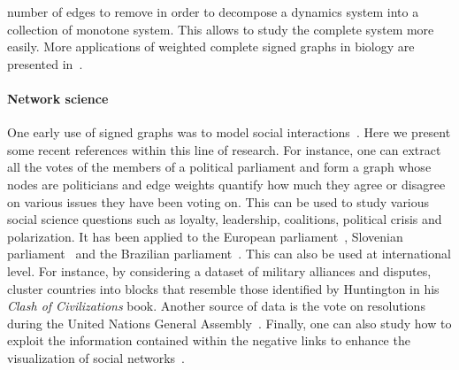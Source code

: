       number of edges to remove in order to decompose a dynamics system into a collection of
      monotone system. This allows to study
      the complete system more easily. More applications of weighted complete signed graphs in biology
      are presented in~\autocite[Section 6]{clusterEditSurvey13}.

      \paragraph{Network science}
      One early use of signed graphs was to model social
      interactions~\autocites{harary1953}{HeiderBook58}. Here we present
      some recent references within this line of research. For instance, one can extract all the
      votes of the members of a
      political parliament and form a graph whose nodes are politicians and edge weights quantify how
      much they agree or disagree on various issues they have been voting on. This can be used to
      study various social science questions such as loyalty, leadership, coalitions, political
      crisis and polarization. It has been applied to the European
      parliament~\autocite{Mendonca2015}, Slovenian parliament~\autocite{Jiang2015} and the
      Brazilian parliament~\autocites{BrazilCC17}. This can also be used at international level. For
      instance, by considering a dataset of military alliances and disputes, \textcite{Traag2009}
      cluster countries into blocks that resemble those identified by Huntington in his \emph{Clash
      of Civilizations} book. Another source of data is the vote on resolutions during the United
      Nations General Assembly~\autocite{CommunityUN12}. Finally, one can also study how to exploit
      the information contained within the negative links to enhance the visualization of social
      networks~\autocites{Luca10}{drawingSignedGraphs11}.

